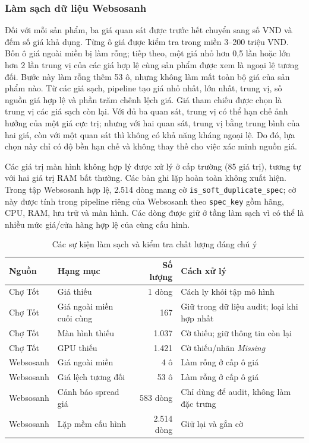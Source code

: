 \subsubsection{Làm sạch dữ liệu Websosanh}

Đối với mỗi sản phẩm, ba giá quan sát được trước hết chuyển sang số VND và đếm số giá khả dụng. Từng ô giá được kiểm tra trong miền 3--200 triệu VND. Bốn ô giá ngoài miền bị làm rỗng; tiếp theo, một giá nhỏ hơn 0,5 lần hoặc lớn hơn 2 lần trung vị của các giá hợp lệ cùng sản phẩm được xem là ngoại lệ tương đối. Bước này làm rỗng thêm 53 ô, nhưng không làm mất toàn bộ giá của sản phẩm nào. Từ các giá sạch, pipeline tạo giá nhỏ nhất, lớn nhất, trung vị, số nguồn giá hợp lệ và phần trăm chênh lệch giá. Giá tham chiếu được chọn là trung vị các giá sạch còn lại. Với đủ ba quan sát, trung vị có thể hạn chế ảnh hưởng của một giá cực trị; nhưng với hai quan sát, trung vị bằng trung bình của hai giá, còn với một quan sát thì không có khả năng kháng ngoại lệ. Do đó, lựa chọn này chỉ có độ bền hạn chế và không thay thế cho việc xác minh nguồn giá.

Các giá trị màn hình không hợp lý được xử lý ở cấp trường (85 giá trị), tương tự với hai giá trị RAM bất thường. Các bản ghi lặp hoàn toàn không xuất hiện. Trong tập Websosanh hợp lệ, 2.514 dòng mang cờ \texttt{is\_soft\_duplicate\_spec}; cờ này được tính trong pipeline riêng của Websosanh theo \texttt{spec\_key} gồm hãng, CPU, RAM, lưu trữ và màn hình. Các dòng được giữ ở tầng làm sạch vì có thể là nhiều mức giá/cửa hàng hợp lệ của cùng cấu hình.

\begin{table}[H]
\centering
\caption{Các sự kiện làm sạch và kiểm tra chất lượng đáng chú ý}
\label{tab:cleaning-audit}
\begin{tabular}{p{3.2cm}p{2.8cm}r p{4.0cm}}
\toprule
Nguồn & Hạng mục & Số lượng & Cách xử lý \\
\midrule
Chợ Tốt & Giá thiếu & 1 dòng & Cách ly khỏi tập mô hình \\
Chợ Tốt & Giá ngoài miền cuối cùng & 167 & Giữ trong dữ liệu audit; loại khi hợp nhất \\
Chợ Tốt & Màn hình thiếu & 1.037 & Cờ thiếu; giữ thông tin còn lại \\
Chợ Tốt & GPU thiếu & 1.421 & Cờ thiếu/nhãn \textit{Missing} \\
Websosanh & Giá ngoài miền & 4 ô & Làm rỗng ở cấp ô giá \\
Websosanh & Giá lệch tương đối & 53 ô & Làm rỗng ở cấp ô giá \\
Websosanh & Cảnh báo spread giá & 583 dòng & Chỉ dùng để audit, không làm đặc trưng \\
Websosanh & Lặp mềm cấu hình & 2.514 dòng & Giữ lại và gắn cờ \\
\bottomrule
\end{tabular}
\end{table}

